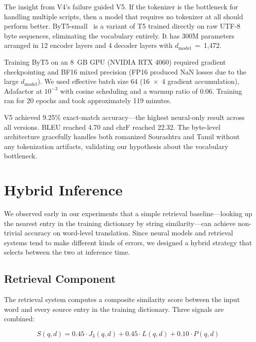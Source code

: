 \documentclass[conference]{IEEEtran}
\begin{document}
The insight from V4's failure guided V5. If the tokenizer is the bottleneck for handling multiple scripts, then a model that requires no tokenizer at all should perform better. ByT5-small~\cite{xue2022byt5} is a variant of T5 trained directly on raw UTF-8 byte sequences, eliminating the vocabulary entirely. It has 300M parameters arranged in 12 encoder layers and 4 decoder layers with $d_\text{model}$~=~1,472.

Training ByT5 on an 8~GB GPU (NVIDIA RTX 4060) required gradient checkpointing and BF16 mixed precision (FP16 produced NaN losses due to the large $d_\text{model}$). We used effective batch size 64 (16~$\times$~4 gradient accumulation), Adafactor at $10^{-3}$ with cosine scheduling and a warmup ratio of 0.06. Training ran for 20 epochs and took approximately 119 minutes.

V5 achieved 9.25\% exact-match accuracy---the highest neural-only result across all versions. BLEU reached 4.70 and chrF reached 22.32. The byte-level architecture gracefully handles both romanized Sourashtra and Tamil without any tokenization artifacts, validating our hypothesis about the vocabulary bottleneck.

\section{Hybrid Inference}\label{sec:hybrid}

We observed early in our experiments that a simple retrieval baseline---looking up the nearest entry in the training dictionary by string similarity---can achieve non-trivial accuracy on word-level translation. Since neural models and retrieval systems tend to make different kinds of errors, we designed a hybrid strategy that selects between the two at inference time.

\subsection{Retrieval Component}

The retrieval system computes a composite similarity score between the input word and every source entry in the training dictionary. Three signals are combined:

\begin{equation}
S(q, d) = 0.45 \cdot J_3(q, d) + 0.45 \cdot L(q, d) + 0.10 \cdot P(q, d)
\label{eq:retrieval}
\end{equation}
\end{document}
